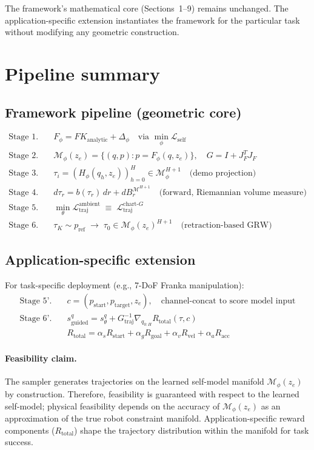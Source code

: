 \documentclass[11pt,a4paper]{article}
\newcommand{\Loss}{\mathcal{L}}
\newcommand{\Mphi}{\mathcal{M}_{\phi}}
\newcommand{\Mset}{\mathcal{M}}
\begin{document}
The framework's mathematical core (Sections~1--9) remains unchanged. The application-specific extension instantiates the framework for the particular task without modifying any geometric construction.

\section{Pipeline summary}

\subsection{Framework pipeline (geometric core)}

\begin{align}
\text{Stage 1.}\quad & F_\phi = FK_{\text{analytic}} + \Delta_\phi \quad \text{via } \min_\phi \Loss_{\text{self}} \\
\text{Stage 2.}\quad & \Mphi(z_e) = \{(q, p) : p = F_\phi(q, z_e)\}, \quad G = I + J_F^T J_F \\
\text{Stage 3.}\quad & \tau_i = (H_\phi(q_h, z_e))_{h=0}^H \in \Mphi^{H+1} \quad \text{(demo projection)} \\
\text{Stage 4.}\quad & d\tau_r = b(\tau_r) \, dr + dB^{\Mset^{H+1}}_r \quad \text{(forward, Riemannian volume measure)} \\
\text{Stage 5.}\quad & \min_\theta \Loss_{\text{traj}}^{\text{ambient}} \;\equiv\; \Loss_{\text{traj}}^{\text{chart-}G} \\
\text{Stage 6.}\quad & \tau_K \sim p_{\text{ref}} \;\to\; \tau_0 \in \Mphi(z_e)^{H+1} \quad \text{(retraction-based GRW)}
\end{align}

\subsection{Application-specific extension}

For task-specific deployment (e.g., 7-DoF Franka manipulation):
\begin{align}
\text{Stage 5'.}\quad & c = (p_{\text{start}}, p_{\text{target}}, z_e), \quad \text{channel-concat to score model input} \\
\text{Stage 6'.}\quad & s_{\text{guided}}^q = s_\theta^q + G_{\text{traj}}^{-1} \nabla_{q_{0:H}} R_{\text{total}}(\tau, c) \\
& R_{\text{total}} = \alpha_s R_{\text{start}} + \alpha_g R_{\text{goal}} + \alpha_v R_{\text{vel}} + \alpha_a R_{\text{acc}}
\end{align}

\paragraph{Feasibility claim.} The sampler generates trajectories on the learned self-model manifold $\Mphi(z_e)$ by construction. Therefore, feasibility is guaranteed with respect to the learned self-model; physical feasibility depends on the accuracy of $\Mphi(z_e)$ as an approximation of the true robot constraint manifold. Application-specific reward components ($R_{\text{total}}$) shape the trajectory distribution within the manifold for task success.
\end{document}
